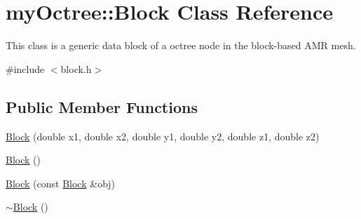 \hypertarget{classmy_octree_1_1_block}{}\section{my\+Octree\+:\+:Block Class Reference}
\label{classmy_octree_1_1_block}


This class is a generic data block of a octree node in the block-\/based A\+M\+R mesh.  




{\ttfamily \#include $<$block.\+h$>$}

\subsection*{Public Member Functions}
\begin{DoxyCompactItemize}
\item 
\hyperlink{classmy_octree_1_1_block_a49ab6b8e1e0d705ae3ae4abcf8269efe}{Block} (double x1, double x2, double y1, double y2, double z1, double z2)
\item 
\hyperlink{classmy_octree_1_1_block_a02b405e5327bde2676ae6433d2f9a1d6}{Block} ()
\item 
\hyperlink{classmy_octree_1_1_block_a71cbba6ef0175deddfe175ceb84c5940}{Block} (const \hyperlink{classmy_octree_1_1_block}{Block} \&obj)
\item 
\hyperlink{classmy_octree_1_1_block_a546f0e61967e1e02367fde3285e4519e}{$\sim$\+Block} ()
\end{DoxyCompactItemize}
